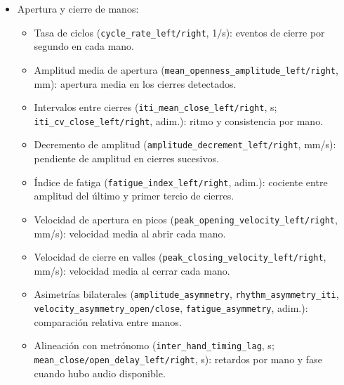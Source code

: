 \begin{sloppypar}
\begin{itemize}
    \item Apertura y cierre de manos:
    \begin{itemize}
        \item Tasa de ciclos (\texttt{cycle\_\allowbreak{}rate\_\allowbreak{}left/\allowbreak{}right}, 1/s): eventos de cierre por segundo en cada mano.
        \item Amplitud media de apertura (\texttt{mean\_\allowbreak{}openness\_\allowbreak{}amplitude\_\allowbreak{}left/\allowbreak{}right}, mm): apertura media en los cierres detectados.
        \item Intervalos entre cierres (\texttt{iti\_\allowbreak{}mean\_\allowbreak{}close\_\allowbreak{}left/\allowbreak{}right}, s; \texttt{iti\_\allowbreak{}cv\_\allowbreak{}close\_\allowbreak{}left/\allowbreak{}right}, adim.): ritmo y consistencia por mano.
        \item Decremento de amplitud (\texttt{amplitude\_\allowbreak{}decrement\_\allowbreak{}left/\allowbreak{}right}, mm/s): pendiente de amplitud en cierres sucesivos.
        \item Índice de fatiga (\texttt{fatigue\_\allowbreak{}index\_\allowbreak{}left/\allowbreak{}right}, adim.): cociente entre amplitud del último y primer tercio de cierres.
        \item Velocidad de apertura en picos (\texttt{peak\_\allowbreak{}opening\_\allowbreak{}velocity\_\allowbreak{}left/\allowbreak{}right}, mm/s): velocidad media al abrir cada mano.
        \item Velocidad de cierre en valles (\texttt{peak\_\allowbreak{}closing\_\allowbreak{}velocity\_\allowbreak{}left/\allowbreak{}right}, mm/s): velocidad media al cerrar cada mano.
        \item Asimetrías bilaterales (\texttt{amplitude\_\allowbreak{}asymmetry}, \texttt{rhythm\_\allowbreak{}asymmetry\_\allowbreak{}iti}, \texttt{velocity\_\allowbreak{}asymmetry\_\allowbreak{}open/\allowbreak{}close}, \texttt{fatigue\_\allowbreak{}asymmetry}, adim.): comparación relativa entre manos.
        \item Alineación con metrónomo (\texttt{inter\_\allowbreak{}hand\_\allowbreak{}timing\_\allowbreak{}lag}, s; \texttt{mean\_\allowbreak{}close/\allowbreak{}open\_\allowbreak{}delay\_\allowbreak{}left/\allowbreak{}right}, s): retardos por mano y fase cuando hubo audio disponible.
    \end{itemize}
\end{itemize}
\end{sloppypar}

